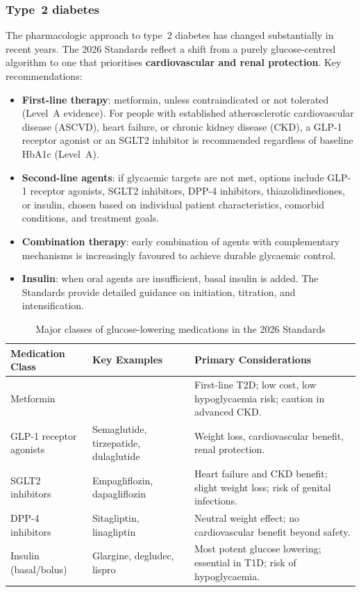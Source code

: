 \documentclass[11pt,a4paper]{article}
\begin{document}
\subsubsection{Type~2 diabetes}

The pharmacologic approach to type~2 diabetes has changed substantially in
recent years. The 2026 Standards reflect a shift from a purely
glucose-centred algorithm to one that prioritises \textbf{cardiovascular and
renal protection}. Key recommendations:

\begin{itemize}
  \item \textbf{First-line therapy}: metformin, unless contraindicated or
        not tolerated (Level~A evidence). For people with established
        atherosclerotic cardiovascular disease (ASCVD), heart failure, or
        chronic kidney disease (CKD), a GLP-1 receptor agonist or an SGLT2
        inhibitor is recommended regardless of baseline HbA1c (Level~A).
  \item \textbf{Second-line agents}: if glycaemic targets are not met,
        options include GLP-1 receptor agonists, SGLT2 inhibitors, DPP-4
        inhibitors, thiazolidinediones, or insulin, chosen based on
        individual patient characteristics, comorbid conditions, and
        treatment goals.
  \item \textbf{Combination therapy}: early combination of agents with
        complementary mechanisms is increasingly favoured to achieve
        durable glycaemic control.
  \item \textbf{Insulin}: when oral agents are insufficient, basal insulin
        is added. The Standards provide detailed guidance on initiation,
        titration, and intensification.
\end{itemize}

\begin{table}[H]
\centering
\small
\caption{Major classes of glucose-lowering medications in the 2026 Standards}
\label{tab:meds}
\begin{tabularx}{\textwidth}{lYY}
\toprule
Medication Class & Key Examples & Primary Considerations \\
\midrule
Metformin & & First-line T2D; low cost, low hypoglycaemia risk;
caution in advanced CKD. \\
GLP-1 receptor agonists & Semaglutide, tirzepatide, dulaglutide & Weight
loss, cardiovascular benefit, renal protection. \\
SGLT2 inhibitors & Empagliflozin, dapagliflozin & Heart failure and CKD
benefit; slight weight loss; risk of genital infections. \\
DPP-4 inhibitors & Sitagliptin, linagliptin & Neutral weight effect; no
cardiovascular benefit beyond safety. \\
Insulin (basal/bolus) & Glargine, degludec, lispro & Most potent glucose
lowering; essential in T1D; risk of hypoglycaemia. \\
\bottomrule
\end{tabularx}
\end{table}
\end{document}
